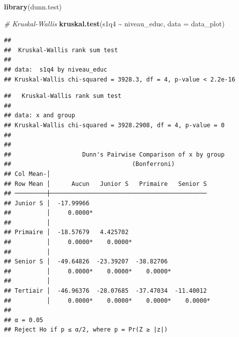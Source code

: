 \documentclass[
]{article}
\newenvironment{Shaded}{\begin{snugshade}}{\end{snugshade}}
\newcommand{\AttributeTok}[1]{\textcolor[rgb]{0.13,0.29,0.53}{#1}}
\newcommand{\CommentTok}[1]{\textcolor[rgb]{0.56,0.35,0.01}{\textit{#1}}}
\newcommand{\ConstantTok}[1]{\textcolor[rgb]{0.56,0.35,0.01}{#1}}
\newcommand{\FunctionTok}[1]{\textcolor[rgb]{0.13,0.29,0.53}{\textbf{#1}}}
\newcommand{\NormalTok}[1]{#1}
\newcommand{\SpecialCharTok}[1]{\textcolor[rgb]{0.81,0.36,0.00}{\textbf{#1}}}
\newcommand{\StringTok}[1]{\textcolor[rgb]{0.31,0.60,0.02}{#1}}
\begin{document}
\begin{Shaded}
\begin{Highlighting}[]
\FunctionTok{library}\NormalTok{(dunn.test)}
\end{Highlighting}
\end{Shaded}

\begin{Shaded}
\begin{Highlighting}[]
\CommentTok{\# Kruskal{-}Wallis}
\FunctionTok{kruskal.test}\NormalTok{(s1q4 }\SpecialCharTok{\textasciitilde{}}\NormalTok{ niveau\_educ, }\AttributeTok{data =}\NormalTok{ data\_plot)}
\end{Highlighting}
\end{Shaded}

\begin{verbatim}
## 
##  Kruskal-Wallis rank sum test
## 
## data:  s1q4 by niveau_educ
## Kruskal-Wallis chi-squared = 3928.3, df = 4, p-value < 2.2e-16
\end{verbatim}

\begin{Shaded}
\end{Shaded}

\begin{verbatim}
##   Kruskal-Wallis rank sum test
## 
## data: x and group
## Kruskal-Wallis chi-squared = 3928.2908, df = 4, p-value = 0
## 
## 
##                    Dunn's Pairwise Comparison of x by group                   
##                                  (Bonferroni)                                 
## Col Mean-│
## Row Mean │      Aucun   Junior S   Primaire   Senior S
## ─────────┼────────────────────────────────────────────
## Junior S │  -17.99966
##          │     0.0000*
##          │
## Primaire │  -18.57679   4.425702
##          │     0.0000*    0.0000*
##          │
## Senior S │  -49.64826  -23.39207  -38.82706
##          │     0.0000*    0.0000*    0.0000*
##          │
## Tertiair │  -46.96376  -28.07685  -37.47034  -11.40012
##          │     0.0000*    0.0000*    0.0000*    0.0000*
## 
## α = 0.05
## Reject Ho if p ≤ α/2, where p = Pr(Z ≥ |z|)
\end{verbatim}
\end{document}
